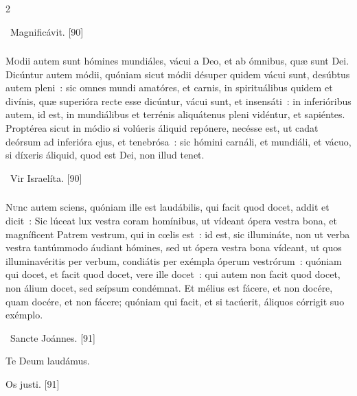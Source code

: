 \documentclass[9pt,twoside]{extarticle}
\begin{document}
\begin{multicols}{2}
{\begin{tightlist}{}
\item {}~Magnificávit. [90]
\end{tightlist}

\subsubsection*{\center {}}
\lettrine{M}odii autem sunt hómines mundiáles, vácui a Deo, et ab ómnibus, quæ sunt Dei. Dicúntur autem módii, quóniam sicut módii désuper quidem vácui sunt, desúbtus autem pleni~: sic omnes mundi amatóres, et carnis, in spirituálibus quidem et divínis, quæ superióra recte esse dicúntur, vácui sunt, et insensáti~: in inferióribus autem, id est, in mundiálibus et terrénis aliquátenus pleni vidéntur, et sapiéntes. Proptérea sicut in módio si volúeris áliquid repónere, necésse est, ut cadat deórsum ad inferióra ejus, et tenebrósa~: sic hómini carnáli, et mundiáli, et vácuo, si díxeris áliquid, quod est Dei, non illud tenet.

\begin{tightlist}{}
\item {}~Vir Israelíta. [90]
\end{tightlist}

\subsubsection*{\center {}}
\lettrine{N}unc autem sciens, quóniam ille est laudábilis, qui facit quod docet, addit et dicit~: Sic lúceat lux vestra coram homínibus, ut vídeant ópera vestra bona, et magníficent Patrem vestrum, qui in cœlis est~: id est, sic illumináte, non ut verba vestra tantúmmodo áudiant hómines, sed ut ópera vestra bona vídeant, ut quos illuminavéritis per verbum, condiátis per exémpla óperum vestrórum~: quóniam qui docet, et facit quod docet, vere ille docet~: qui autem non facit quod docet, non álium docet, sed seípsum condémnat. Et mélius est fácere, et non docére, quam docére, et non fácere; quóniam qui facit, et si tacúerit, áliquos córrigit suo exémplo.

\begin{tightlist}{}
\item {}~Sancte Joánnes. [91]
\item Te Deum laudámus.
\item {} Os justi. [91]
\end{tightlist}

}
\end{multicols}
\end{document}
